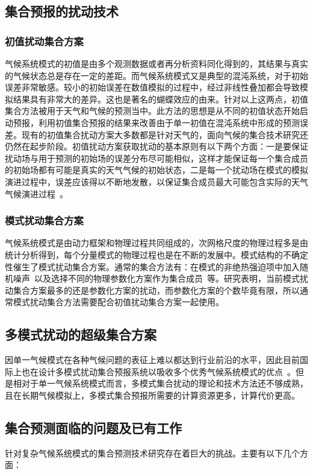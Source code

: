\subsection{集合预报的扰动技术}
\subsubsection{初值扰动集合方案}
\label{sec:basictable}
气候系统模式的初值是由多个观测数据或者再分析资料同化得到的，其结果与真实的气候状态总是存在一定的差距。而气候系统模式又是典型的混沌系统，对于初始误差非常敏感。较小的初始误差在数值模拟的过程中，经过非线性叠加都会导致模拟结果具有非常大的差异。这也是著名的蝴蝶效应的由来。针对以上这两点，初值集合方法被用于天气和气候的预测当中。此方法的思想是从不同的初值状态开始启动预报，利用初值集合预报的结果来改善由于单一初值在混沌系统中形成的预测误差。现有的初值集合扰动方案大多数都是针对天气的，面向气候的集合技术研究还仍然在起步阶段。初值扰动方案获取扰动的基本原则有以下两个方面：一是要保证扰动场与用于预测的初始场的误差分布尽可能相似，这样才能保证每一个集合成员的初始场都有可能是真实的天气气候的初始状态，二是每一个扰动场在模式的模拟演进过程中，误差应该得以不断地发散，以保证集合成员最大可能包含实际的天气气候演进过程~\cite{陈静2002集合数值预报发展与研究进展}。

\subsubsection{模式扰动集合方案}
气候系统模式是由动力框架和物理过程共同组成的，次网格尺度的物理过程多是由统计分析得到，每个分量模式的物理过程也是在不断的发展中。模式结构的不确定性催生了模式扰动集合方案。通常的集合方法有：在模式的非绝热强迫项中加入随机噪声~\cite{buizza1999stochastic,berner2009spectral}以及选择不同的物理参数化方案作为集合成员~\cite{houtekamer1996system}等。研究表明，当前模式扰动集合方案最多的还是参数化方案的扰动，而参数化方案的个数毕竟有限，所以通常模式扰动集合方法需要配合初值扰动集合方案一起使用。

\subsection{多模式扰动的超级集合方案}
因单一气候模式在各种气候问题的表征上难以都达到行业前沿的水平，因此目前国际上也在设计多模式扰动集合预报系统以吸收多个优秀气候系统模式的优点~\cite{mylne1999quasi,evans1997joint}。但是相对于单一气候系统模式而言，多模式集合扰动的理论和技术方法还不够成熟，且在长期气候模拟上，多模式集合预报所需要的计算资源更多，计算代价更高。

\subsection{集合预测面临的问题及已有工作}
针对复杂气候系统模式的集合预测技术研究存在着巨大的挑战。主要有以下几个方面：

